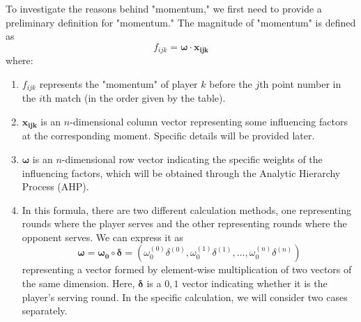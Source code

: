 \documentclass[12pt, a4paper, oneside]{article}
\theoremstyle{break}
\begin{document}

\indent To investigate the reasons behind "momentum," we first need to provide a preliminary definition for "momentum." The magnitude of "momentum" is defined as $$f_{ijk}=\boldsymbol{\omega}\cdot\boldsymbol{x_{ijk}}$$
where:
\begin{enumerate}
    \item $f_{ijk}$ represents the "momentum" of player $k$ before the $j$th point number in the $i$th match (in the order given by the table).
    \item $\boldsymbol{x_{ijk}}$ is an $n$-dimensional column vector representing some influencing factors at the corresponding moment. Specific details will be provided later.
    \item $\boldsymbol{\omega}$ is an $n$-dimensional row vector indicating the specific weights of the influencing factors, which will be obtained through the Analytic Hierarchy Process (AHP).
    \item In this formula, there are two different calculation methods, one representing rounds where the player serves and the other representing rounds where the opponent serves. We can express it as $$\boldsymbol{\omega}=\boldsymbol{\omega_0} \circ \boldsymbol{\delta}=(\omega_0^{(0)}\delta^{(0)},\omega_0^{(1)}\delta^{(1)},\dots,\omega_0^{(n)}\delta^{(n)})$$ representing a vector formed by element-wise multiplication of two vectors of the same dimension. Here, $\boldsymbol{\delta}$ is a $0,1$ vector indicating whether it is the player's serving round. In the specific calculation, we will consider two cases separately.
\end{enumerate}
\end{document}
